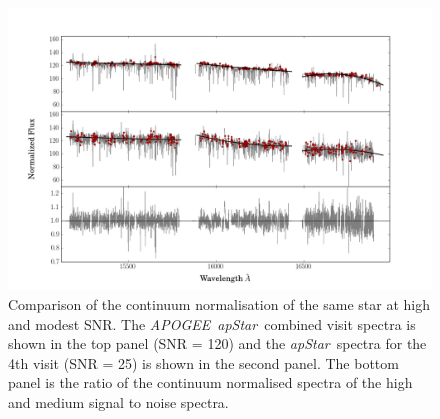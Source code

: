\documentclass[12pt, preprint]{aastex}
\newcommand{\apogee}{\textsl{APOGEE}}
\newcommand{\apstar}{\textsl{apStar}}
\begin{document}
 \begin{figure}[!h]
  \includegraphics[width=\hsize]{./plots/SNR_continuum4.png}
  \caption{Comparison of the continuum normalisation of the same star at high and modest SNR. The \apogee\ \apstar\ combined visit spectra is shown in the top panel (SNR = 120) and the \apstar\ spectra for the 4th visit (SNR = 25) is shown in the second panel. The bottom panel is the ratio of the continuum normalised spectra of the high and medium signal to noise spectra. }
\label{fig:lowsnr}
\end{figure}
\end{document}

